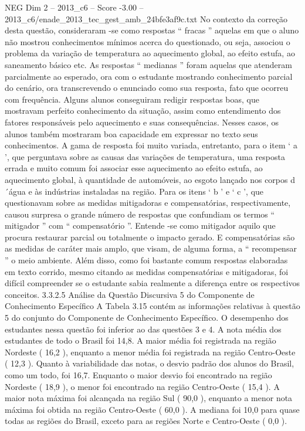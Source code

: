 \begin{textsample}{NEG Dim 2 – 2013\_c6 – Score -3.00 – 2013\_c6/enade\_2013\_tec\_gest\_amb\_24bfe3af9c.txt}
No contexto da correção desta questão, consideraram -se como respostas “ fracas ” aquelas em que o aluno não mostrou conhecimentos mínimos acerca do questionado, ou seja, associou o problema da variação de temperatura ao aquecimento global, ao efeito estufa, ao saneamento básico etc.
As respostas “ medianas ” foram aquelas que atenderam parcialmente ao esperado, ora com o estudante mostrando conhecimento parcial do cenário, ora transcrevendo o enunciado como sua resposta, fato que ocorreu com frequência.
Alguns alunos conseguiram redigir respostas boas, que mostravam perfeito conhecimento da situação, assim como entendimento dos fatores responsáveis pelo aquecimento e suas consequências.
Nesses casos, os alunos também mostraram boa capacidade em expressar no texto seus conhecimentos.
A gama de resposta foi muito variada, entretanto, para o item ‘ a ’, que perguntava sobre as causas das variações de temperatura, uma resposta errada e muito comum foi associar esse aquecimento ao efeito estufa, ao aquecimento global, à quantidade de automóveis, ao esgoto lançado nos corpos d´água e às indústrias instaladas na região.
Para os itens ‘ b ’ e ‘ c ’, que questionavam sobre as medidas mitigadoras e compensatórias, respectivamente, causou surpresa o grande número de respostas que confundiam os termos “ mitigador ” com “ compensatório ”.
Entende -se como mitigador aquilo que procura restaurar parcial ou totalmente o impacto gerado.
E compensatórias são as medidas de caráter mais amplo, que visam, de alguma forma, a “ recompensar ” o meio ambiente.
Além disso, como foi bastante comum respostas elaboradas em texto corrido, mesmo citando as medidas compensatórias e mitigadoras, foi difícil compreender se o estudante sabia realmente a diferença entre os respectivos conceitos. 3.3.2.5 Análise da Questão Discursiva 5 do Componente de Conhecimento Específico A Tabela 3.15 contém as informações relativas à questão 5 do conjunto do Componente de Conhecimento Específico.
O desempenho dos estudantes nessa questão foi inferior ao das questões 3 e 4.
A nota média dos estudantes de todo o Brasil foi 14,8.
A maior média foi registrada na região Nordeste ( 16,2 ), enquanto a menor média foi registrada na região Centro-Oeste ( 12,3 ).
Quanto à variabilidade das notas, o desvio padrão dos alunos do Brasil, como um todo, foi 16,7.
Enquanto o maior desvio foi encontrado na região Nordeste ( 18,9 ), o menor foi encontrado na região Centro-Oeste ( 15,4 ).
A maior nota máxima foi alcançada na região Sul ( 90,0 ), enquanto a menor nota máxima foi obtida na região Centro-Oeste ( 60,0 ).
A mediana foi 10,0 para quase todas as regiões do Brasil, exceto para as regiões Norte e Centro-Oeste ( 0,0 ).

\end{textsample}
